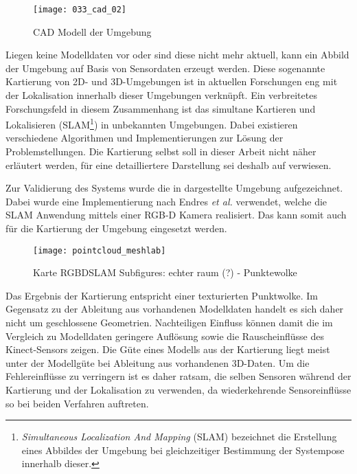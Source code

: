 \begin{figure}[ht]
	\begin{center}
		\texttt{[image: 033\_cad\_02]}
		\caption{CAD Modell der Umgebung}
		\label{fig.mapMod}
	\end{center}
\end{figure}

Liegen keine Modelldaten vor oder sind diese nicht mehr aktuell, kann ein Abbild der Umgebung auf Basis von Sensordaten erzeugt werden. Diese sogenannte Kartierung von 2D- und 3D-Umgebungen ist in aktuellen Forschungen eng mit der Lokalisation innerhalb dieser Umgebungen verknüpft. Ein verbreitetes Forschungsfeld in diesem Zusammenhang ist das simultane Kartieren und Lokalisieren (SLAM\footnote{\textit{Simultaneous Localization And Mapping} (SLAM) bezeichnet die Erstellung eines Abbildes der Umgebung bei gleichzeitiger Bestimmung der Systempose innerhalb dieser.}) in unbekannten Umgebungen. Dabei existieren verschiedene Algorithmen und Implementierungen zur Lösung der Problemstellungen. Die Kartierung selbst soll in dieser Arbeit nicht näher erläutert werden, für eine detailliertere Darstellung sei deshalb auf \cite{Durrant2006} verwiesen.\\


Zur Validierung des Systems wurde die in  dargestellte Umgebung aufgezeichnet. Dabei wurde eine Implementierung \cite{Rgbdslam} nach Endres \textit{et al.} \cite{Endres2014} verwendet, welche die SLAM Anwendung mittels einer RGB-D Kamera realisiert. Das \kps{} kann somit auch für die Kartierung der Umgebung eingesetzt werden.\\

\begin{figure}[ht]
	\begin{center}
		\texttt{[image: pointcloud\_meshlab]}
		\caption{Karte RGBDSLAM Subfigures: echter raum (?) - Punktewolke}
		\label{fig.mapSLAM}
	\end{center}
\end{figure}


Das Ergebnis der Kartierung entspricht einer texturierten Punktwolke. Im Gegensatz zu der Ableitung aus vorhandenen Modelldaten handelt es sich daher nicht um geschlossene Geometrien. Nachteiligen Einfluss können damit die im Vergleich zu Modelldaten geringere Auflösung sowie die Rauscheinflüsse des Kinect-Sensors zeigen. Die Güte eines Modells aus der Kartierung liegt meist unter der Modellgüte bei Ableitung aus vorhandenen 3D-Daten. Um die Fehlereinflüsse zu verringern ist es daher ratsam, die selben Sensoren während der Kartierung und der Lokalisation zu verwenden, da wiederkehrende Sensoreinflüsse so bei beiden Verfahren auftreten.\\

